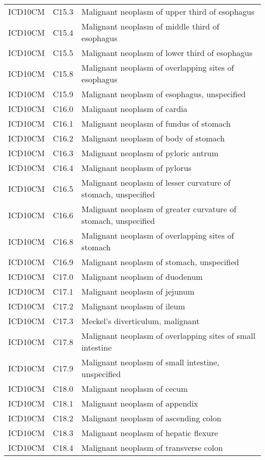 \begin{longtable}{p{}p{}p{}}
  ICD10CM & C15.3 & Malignant neoplasm of upper third of esophagus \\ 
  ICD10CM & C15.4 & Malignant neoplasm of middle third of esophagus \\ 
  ICD10CM & C15.5 & Malignant neoplasm of lower third of esophagus \\ 
  ICD10CM & C15.8 & Malignant neoplasm of overlapping sites of esophagus \\ 
  ICD10CM & C15.9 & Malignant neoplasm of esophagus, unspecified \\ 
  ICD10CM & C16.0 & Malignant neoplasm of cardia \\ 
  ICD10CM & C16.1 & Malignant neoplasm of fundus of stomach \\ 
  ICD10CM & C16.2 & Malignant neoplasm of body of stomach \\ 
  ICD10CM & C16.3 & Malignant neoplasm of pyloric antrum \\ 
  ICD10CM & C16.4 & Malignant neoplasm of pylorus \\ 
  ICD10CM & C16.5 & Malignant neoplasm of lesser curvature of stomach, unspecified \\ 
  ICD10CM & C16.6 & Malignant neoplasm of greater curvature of stomach, unspecified \\ 
  ICD10CM & C16.8 & Malignant neoplasm of overlapping sites of stomach \\ 
  ICD10CM & C16.9 & Malignant neoplasm of stomach, unspecified \\ 
  ICD10CM & C17.0 & Malignant neoplasm of duodenum \\ 
  ICD10CM & C17.1 & Malignant neoplasm of jejunum \\ 
  ICD10CM & C17.2 & Malignant neoplasm of ileum \\ 
  ICD10CM & C17.3 & Meckel's diverticulum, malignant \\ 
  ICD10CM & C17.8 & Malignant neoplasm of overlapping sites of small intestine \\ 
  ICD10CM & C17.9 & Malignant neoplasm of small intestine, unspecified \\ 
  ICD10CM & C18.0 & Malignant neoplasm of cecum \\ 
  ICD10CM & C18.1 & Malignant neoplasm of appendix \\ 
  ICD10CM & C18.2 & Malignant neoplasm of ascending colon \\ 
  ICD10CM & C18.3 & Malignant neoplasm of hepatic flexure \\ 
  ICD10CM & C18.4 & Malignant neoplasm of transverse colon \\ 

\end{longtable}
